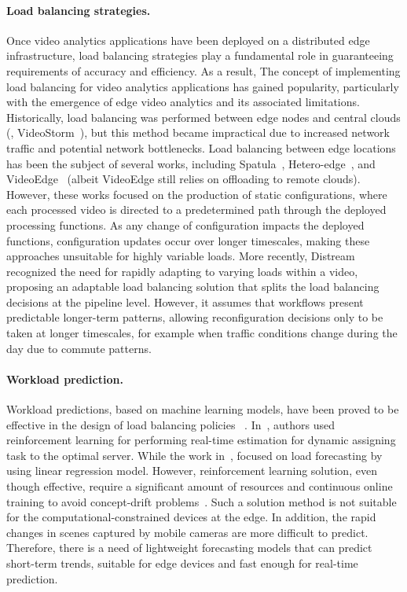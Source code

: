 \paragraph{Load balancing strategies.} Once video analytics applications have been deployed on a distributed edge infrastructure, load balancing strategies play a fundamental role in guaranteeing requirements of accuracy and efficiency. As a result, The concept of implementing load balancing for video analytics applications has gained popularity, particularly with the emergence of edge video analytics and its associated limitations. Historically, load balancing was performed between edge nodes and central clouds (\eg, VideoStorm~\cite{201465videostorm}), but this method became impractical due to increased network traffic and potential network bottlenecks. Load balancing between edge locations has been the subject of several works, including Spatula~\cite{jain2020spatula}, Hetero-edge~\cite{zhang2019hetero}, and VideoEdge~\cite{hung2018videoedge} (albeit VideoEdge still relies on offloading to remote clouds). However, these works focused on the production of static configurations, where each processed video is directed to a predetermined path through the deployed processing functions. As any change of configuration impacts the deployed functions, configuration updates occur over longer timescales, making these approaches unsuitable for highly variable loads. More recently, Distream~\cite{zeng2020distream} recognized the need for rapidly adapting to varying loads within a video, proposing an adaptable load balancing solution that splits the load balancing decisions at the pipeline level. However, it assumes that workflows present predictable longer-term patterns, allowing reconfiguration decisions only to be taken at longer timescales, for example when traffic conditions change during the day due to commute patterns.


\paragraph{Workload prediction.} Workload predictions, based on machine learning models, have been proved to be effective in the design of load balancing policies%
~\cite{10.1145/2611286.2611314,gedik2013elastic,kombi2017preventive,zeng2020distream}. In~\cite{yuan2021online}, authors used reinforcement learning for performing real-time estimation for dynamic assigning task to the optimal server. While the work in~\cite{kombi2017preventive}, focused on load forecasting by using linear regression model. However, reinforcement learning solution, even though effective, require a significant amount of resources and continuous online training to avoid concept-drift problems~\cite{zhang2020reinforcement}. Such a solution method is not suitable for the computational-constrained devices at the edge. In addition, the rapid changes in scenes captured by mobile cameras are more difficult to predict. Therefore, there is a need of lightweight forecasting models that can predict short-term trends, suitable for edge devices and fast enough for real-time prediction.

